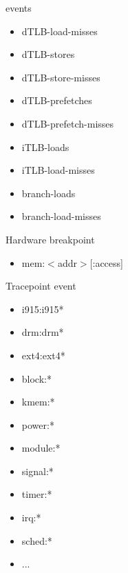 \begin{frame}{events}
\begin{tiny}
\begin{multicols}{3}
\begin{itemize}
  \item dTLB-load-misses
  \item dTLB-stores
  \item dTLB-store-misses
  \item dTLB-prefetches
  \item dTLB-prefetch-misses
  \item iTLB-loads
  \item iTLB-load-misses
  \item branch-loads
  \item branch-load-misses
\end{itemize}
Hardware breakpoint
\begin{itemize}
  \item mem:$<$addr$>$[:access]
\end{itemize}
Tracepoint event
\begin{itemize}
  \item i915:i915*
  \item drm:drm*
  \item ext4:ext4*
  \item block:*
  \item kmem:*
  \item power:*
  \item module:*
  \item signal:*
  \item timer:*
  \item irq:*
  \item sched:*
  \item ...
\end{itemize}
\end{multicols}
\end{tiny}
\end{frame}


